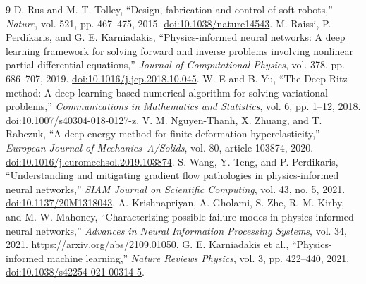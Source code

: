 \documentclass[11pt,a4paper]{article}
\begin{document}
\begin{thebibliography}{9}
 D. Rus and M. T. Tolley, ``Design, fabrication and control of soft robots,'' \emph{Nature}, vol. 521, pp. 467--475, 2015. \href{https://doi.org/10.1038/nature14543}{doi:10.1038/nature14543}.
 M. Raissi, P. Perdikaris, and G. E. Karniadakis, ``Physics-informed neural networks: A deep learning framework for solving forward and inverse problems involving nonlinear partial differential equations,'' \emph{Journal of Computational Physics}, vol. 378, pp. 686--707, 2019. \href{https://doi.org/10.1016/j.jcp.2018.10.045}{doi:10.1016/j.jcp.2018.10.045}.
 W. E and B. Yu, ``The Deep Ritz method: A deep learning-based numerical algorithm for solving variational problems,'' \emph{Communications in Mathematics and Statistics}, vol. 6, pp. 1--12, 2018. \href{https://doi.org/10.1007/s40304-018-0127-z}{doi:10.1007/s40304-018-0127-z}.
 V. M. Nguyen-Thanh, X. Zhuang, and T. Rabczuk, ``A deep energy method for finite deformation hyperelasticity,'' \emph{European Journal of Mechanics--A/Solids}, vol. 80, article 103874, 2020. \href{https://doi.org/10.1016/j.euromechsol.2019.103874}{doi:10.1016/j.euromechsol.2019.103874}.
 S. Wang, Y. Teng, and P. Perdikaris, ``Understanding and mitigating gradient flow pathologies in physics-informed neural networks,'' \emph{SIAM Journal on Scientific Computing}, vol. 43, no. 5, 2021. \href{https://doi.org/10.1137/20M1318043}{doi:10.1137/20M1318043}.
 A. Krishnapriyan, A. Gholami, S. Zhe, R. M. Kirby, and M. W. Mahoney, ``Characterizing possible failure modes in physics-informed neural networks,'' \emph{Advances in Neural Information Processing Systems}, vol. 34, 2021. \url{https://arxiv.org/abs/2109.01050}.
 G. E. Karniadakis et al., ``Physics-informed machine learning,'' \emph{Nature Reviews Physics}, vol. 3, pp. 422--440, 2021. \href{https://doi.org/10.1038/s42254-021-00314-5}{doi:10.1038/s42254-021-00314-5}.
\end{thebibliography}
\end{document}
